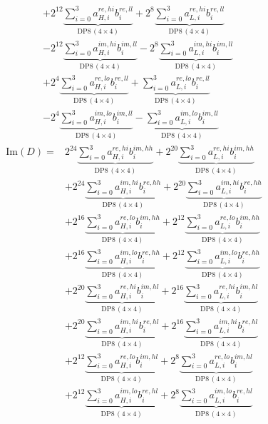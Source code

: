 \documentclass[fleqn]{article}
\newcommand{\DPop}[3]{\mathrm{DP#1}\,(#2\!\times\!#3)}
\begin{document}
\begin{align*}
  & + 2^{12}\underbrace{\sum_{i=0}^{3} a_{H,i}^{re,hi} b_i^{re,ll}}_{\DPop{8}{4}{4}} + 2^{8}\underbrace{\sum_{i=0}^{3} a_{L,i}^{re,hi} b_i^{re,ll}}_{\DPop{8}{4}{4}} \\[0.4em]
  & - 2^{12}\underbrace{\sum_{i=0}^{3} a_{H,i}^{im,hi} b_i^{im,ll}}_{\DPop{8}{4}{4}} - 2^{8}\underbrace{\sum_{i=0}^{3} a_{L,i}^{im,hi} b_i^{im,ll}}_{\DPop{8}{4}{4}} \\[0.4em]
  & + 2^{4}\underbrace{\sum_{i=0}^{3} a_{H,i}^{re,lo} b_i^{re,ll}}_{\DPop{8}{4}{4}} + \underbrace{\sum_{i=0}^{3} a_{L,i}^{re,lo} b_i^{re,ll}}_{\DPop{8}{4}{4}} \\[0.4em]
  & - 2^{4}\underbrace{\sum_{i=0}^{3} a_{H,i}^{im,lo} b_i^{im,ll}}_{\DPop{8}{4}{4}} - \underbrace{\sum_{i=0}^{3} a_{L,i}^{im,lo} b_i^{im,ll}}_{\DPop{8}{4}{4}}
\end{align*}
\begin{align*}
\mathrm{Im}(D) = {}
  & 2^{24}\underbrace{\sum_{i=0}^{3} a_{H,i}^{re,hi} b_i^{im,hh}}_{\DPop{8}{4}{4}} + 2^{20}\underbrace{\sum_{i=0}^{3} a_{L,i}^{re,hi} b_i^{im,hh}}_{\DPop{8}{4}{4}} \\[0.4em]
  & + 2^{24}\underbrace{\sum_{i=0}^{3} a_{H,i}^{im,hi} b_i^{re,hh}}_{\DPop{8}{4}{4}} + 2^{20}\underbrace{\sum_{i=0}^{3} a_{L,i}^{im,hi} b_i^{re,hh}}_{\DPop{8}{4}{4}} \\[0.4em]
  & + 2^{16}\underbrace{\sum_{i=0}^{3} a_{H,i}^{re,lo} b_i^{im,hh}}_{\DPop{8}{4}{4}} + 2^{12}\underbrace{\sum_{i=0}^{3} a_{L,i}^{re,lo} b_i^{im,hh}}_{\DPop{8}{4}{4}} \\[0.4em]
  & + 2^{16}\underbrace{\sum_{i=0}^{3} a_{H,i}^{im,lo} b_i^{re,hh}}_{\DPop{8}{4}{4}} + 2^{12}\underbrace{\sum_{i=0}^{3} a_{L,i}^{im,lo} b_i^{re,hh}}_{\DPop{8}{4}{4}} \\[0.4em]
  & + 2^{20}\underbrace{\sum_{i=0}^{3} a_{H,i}^{re,hi} b_i^{im,hl}}_{\DPop{8}{4}{4}} + 2^{16}\underbrace{\sum_{i=0}^{3} a_{L,i}^{re,hi} b_i^{im,hl}}_{\DPop{8}{4}{4}} \\[0.4em]
  & + 2^{20}\underbrace{\sum_{i=0}^{3} a_{H,i}^{im,hi} b_i^{re,hl}}_{\DPop{8}{4}{4}} + 2^{16}\underbrace{\sum_{i=0}^{3} a_{L,i}^{im,hi} b_i^{re,hl}}_{\DPop{8}{4}{4}} \\[0.4em]
  & + 2^{12}\underbrace{\sum_{i=0}^{3} a_{H,i}^{re,lo} b_i^{im,hl}}_{\DPop{8}{4}{4}} + 2^{8}\underbrace{\sum_{i=0}^{3} a_{L,i}^{re,lo} b_i^{im,hl}}_{\DPop{8}{4}{4}} \\[0.4em]
  & + 2^{12}\underbrace{\sum_{i=0}^{3} a_{H,i}^{im,lo} b_i^{re,hl}}_{\DPop{8}{4}{4}} + 2^{8}\underbrace{\sum_{i=0}^{3} a_{L,i}^{im,lo} b_i^{re,hl}}_{\DPop{8}{4}{4}} \\[0.4em]

\end{align*}
\end{document}
